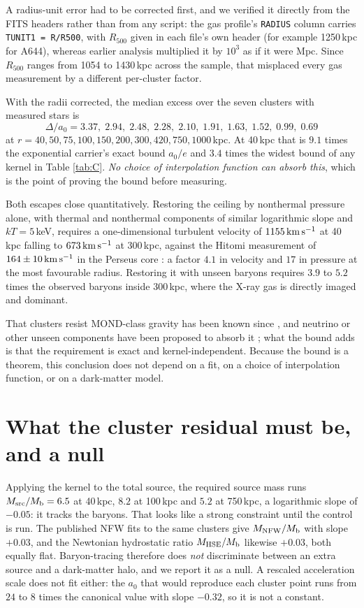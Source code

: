 \documentclass[11pt,letterpaper]{article}
\begin{document}
A radius-unit error had to be corrected first, and we verified it directly from the FITS headers rather than from any script: the gas profile's \texttt{RADIUS} column carries \texttt{TUNIT1 = R/R500}, with $R_{500}$ given in each file's own header (for example 1250\,kpc for A644), whereas earlier analysis multiplied it by $10^3$ as if it were Mpc. Since $R_{500}$ ranges from 1054 to 1430\,kpc across the sample, that misplaced every gas measurement by a different per-cluster factor.

With the radii corrected, the median excess over the seven clusters with measured stars is
\[
\Delta/a_0 = 3.37,\;2.94,\;2.48,\;2.28,\;2.10,\;1.91,\;1.63,\;1.52,\;0.99,\;0.69
\]
at $r=40,50,75,100,150,200,300,420,750,1000$\,kpc. At 40\,kpc that is $9.1$ times the exponential carrier's exact bound $a_0/e$ and $3.4$ times the widest bound of any kernel in Table \ref{tab:C}. \emph{No choice of interpolation function can absorb this}, which is the point of proving the bound before measuring.

Both escapes close quantitatively. Restoring the ceiling by nonthermal pressure alone, with thermal and nonthermal components of similar logarithmic slope and $kT=5$\,keV, requires a one-dimensional turbulent velocity of $1155\,{\rm km\,s^{-1}}$ at 40\,kpc falling to $673\,{\rm km\,s^{-1}}$ at 300\,kpc, against the Hitomi measurement of $164\pm10\,{\rm km\,s^{-1}}$ in the Perseus core \cite{hitomi}: a factor $4.1$ in velocity and $17$ in pressure at the most favourable radius. Restoring it with unseen baryons requires $3.9$ to $5.2$ times the observed baryons inside 300\,kpc, where the X-ray gas is directly imaged and dominant.

That clusters resist MOND-class gravity has been known since \cite{sanders03}, and neutrino or other unseen components have been proposed to absorb it \cite{angus08}; what the bound adds is that the requirement is exact and kernel-independent. Because the bound is a theorem, this conclusion does not depend on a fit, on a choice of interpolation function, or on a dark-matter model.

\section{What the cluster residual must be, and a null}
Applying the kernel to the total source, the required source mass runs $M_{\rm src}/M_{\rm b}=6.5$ at 40\,kpc, $8.2$ at 100\,kpc and $5.2$ at 750\,kpc, a logarithmic slope of $-0.05$: it tracks the baryons. That looks like a strong constraint until the control is run. The published NFW \cite{nfw} fits to the same clusters give $M_{\rm NFW}/M_{\rm b}$ with slope $+0.03$, and the Newtonian hydrostatic ratio $M_{\rm HSE}/M_{\rm b}$ likewise $+0.03$, both equally flat. Baryon-tracing therefore does \emph{not} discriminate between an extra source and a dark-matter halo, and we report it as a null. A rescaled acceleration scale does not fit either: the $a_0$ that would reproduce each cluster point runs from $24$ to $8$ times the canonical value with slope $-0.32$, so it is not a constant.
\end{document}
